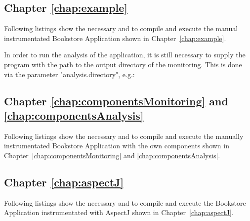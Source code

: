     \subsection{Chapter \ref{chap:example}}
      Following listings show the necessary  and  to compile and execute the manual instrumentated Bookstore Application shown in Chapter~\ref{chap:example}.
      \setXMLListing
      
      
      In order to run the analysis of the application, it is still necessary to supply the program with the path to the output directory of the monitoring. This is done via the parameter "analysis.directory", e.g.:
      \setBashListing
      

    \subsection{Chapter \ref{chap:componentsMonitoring} and \ref{chap:componentsAnalysis}}
      Following listings show the necessary  and  to compile and execute the manually instrumentated Bookstore Application with the own components shown in Chapter~\ref{chap:componentsMonitoring} and \ref{chap:componentsAnalysis}.
      \setXMLListing
      
      

    \subsection{Chapter \ref{chap:aspectJ}}
      Following listings show the necessary  and  to compile and execute the Bookstore Application instrumentated with AspectJ shown in Chapter~\ref{chap:aspectJ}.
      \setXMLListing
      
           

\newpage
